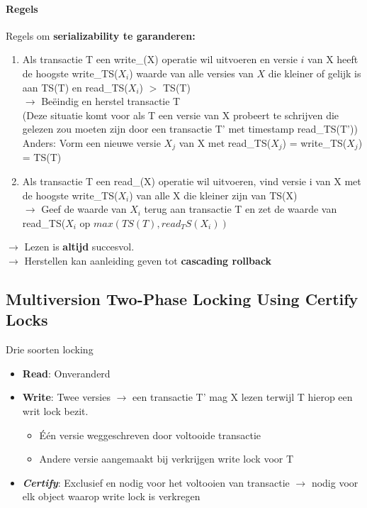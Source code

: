 \paragraph{Regels} Regels om \textbf{serializability te garanderen:}
\begin{enumerate}
	\item Als transactie T een write\_(X) operatie wil uitvoeren en versie $i$ van X heeft de hoogste write\_TS($X_i$) waarde van alle versies van $X$	 die kleiner of gelijk is aan TS(T) en read\_TS($X_i$) $>$ TS(T)\\ 
	$\rightarrow$ Be\"eindig en herstel transactie T \\
	(Deze situatie komt voor als T een versie van X probeert te schrijven die gelezen zou moeten zijn door een transactie T' met timestamp read\_TS(T'))
	\\ Anders: Vorm een nieuwe versie $X_j$ van X met read\_TS($X_j$) = write\_TS($X_j$) = TS(T)

	\item Als transactie T een read\_(X) operatie wil uitvoeren, vind versie i van X met de hoogste write\_TS($X_i$) van alle X die kleiner zijn van TS(X) \\
	$\rightarrow$ Geef de waarde van $X_i$ terug aan transactie T en zet de waarde van read\_TS($X_i$ op $max(TS(T),read_TS(X_i))$
\end{enumerate}
$\rightarrow$ Lezen is \textbf{altijd} succesvol. \\
$\rightarrow$ Herstellen kan aanleiding geven tot \textbf{cascading rollback}


\subsection{Multiversion Two-Phase Locking Using Certify Locks}%
Drie soorten locking
\begin{itemize}
	\item \textbf{Read}:  Onveranderd
	\item \textbf{Write}: Twee versies $\rightarrow$ een transactie T' mag X lezen terwijl T hierop een writ lock bezit.  
	\begin{itemize}
		\item \'E\'en versie weggeschreven door voltooide transactie
		\item Andere versie aangemaakt bij verkrijgen write lock voor T
	\end{itemize}
	\item \textbf{\textit{Certify}}: Exclusief en nodig voor het voltooien van transactie $\rightarrow$ nodig voor elk object waarop write lock is verkregen
\end{itemize}
